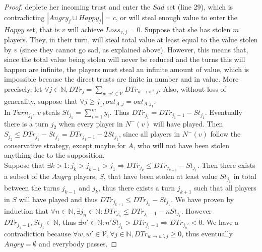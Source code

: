 \documentclass[11pt]{article}
\theoremstyle{definition}
\theoremstyle{corollary}
\theoremstyle{lemma}
\begin{document}
\begin{proof}
       deplete her incoming trust and enter the $Sad$ set (line 29), which is contradicting $|Angry_j \cup Happy_j| = c$,
       or will steal enough value to enter the $Happy$ set, that is $v$ will achieve $Loss_{v, j} = 0$. Suppose that she has
       stolen $m$ players. They, in their turn, will steal total value at least equal to the value stolen by $v$ (since they
       cannot go sad, as explained above). However, this means that, since the total value being stolen will never be reduced
       and the turns this will happen are infinite, the players must steal an infinite amount of value, which is impossible
       because the direct trusts are finite in number and in value. More precisely, let $\forall j \in \mathbb{N}, DTr_j =
       \sum\limits_{w,w' \in \mathcal{V}}DTr_{w \rightarrow w', j}$. Also, without loss of generality, suppose that $\forall
       j \geq j_1, out_{A, j} = out_{A, j_1}$. \\ In $Turn_{j_1}$, $v$ steals $St_{j_1} = \sum\limits_{i=1}^{m}y_i$. Thus
       $DTr_{j_1} = DTr_{j_1-1} - St_{j_1}$. Eventually there is a turn $j_2$ when every player in $N^{-}(v)$ will have
       played. Then $S_{j_2} \leq DTr_{j_1} - St_{j_1} = DTr_{j_1-1} - 2St_{j_1}$, since all players in $N^{-}(v)$ follow the
       conservative strategy, except maybe for $A$, who will not have been stolen anything due to the supposition. \\
       Suppose that $\exists k > 1 : j_k > j_{k-1} > j_1 \Rightarrow DTr_{j_k} \leq DTr_{j_{k-1}} - St_{j_1}$. Then there
       exists a subset of the $Angry$ players, $S$, that have been stolen at least value $St_{j_1}$ in total between the
       turns $j_{k-1}$ and $j_k$, thus there exists a turn $j_{k+1}$ such that all players in $S$ will have played and thus
       $DTr_{j_{k+1}} \leq DTr_{j_k} - St_{j_1}$. We have proven by induction that $\forall n \in \mathbb{N}, \exists j_n \in
       \mathbb{N} : DTr_{j_n} \leq DTr_{j_1-1} - nSt_{j_1}$. However $DTr_{j_1-1}, St_{j_1} \in \mathbb{N}$, thus $\exists n'
       \in \mathbb{N} : n'St_{j_1} > DTr_{j_1-1} \Rightarrow DTr_{j_n'} < 0$. We have a contradiction because $\forall w,w'
       \in \mathcal{V}, \forall j \in \mathbb{N}, DTr_{w \rightarrow w', j} \geq 0$, thus eventually $Angry = \emptyset$ and
       everybody passes.
    \end{proof}
\end{document}
